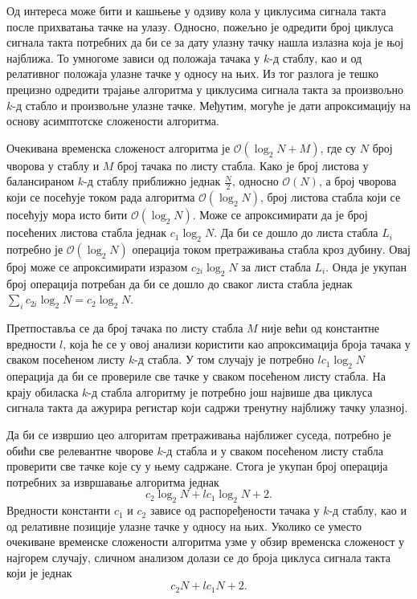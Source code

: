 \documentclass[master]{finthesis}
\newcommand*{\kd}{\texorpdfstring{$k$}{k}-д }
\begin{document}
Од интереса може бити и кашњење у одзиву кола у циклусима сигнала такта после прихватања тачке на улазу. Односно, пожељно је одредити број циклуса сигнала такта потребних да би се за дату улазну тачку нашла излазна која је њој најближа. То умногоме зависи од положаја тачака у \kd стаблу, као и од релативног положаја улазне тачке у односу на њих. Из тог разлога је тешко прецизно одредити трајање алгоритма у циклусима сигнала такта за произвољно \kd стабло и произвољне улазне тачке. Међутим, могуће је дати апроксимацију на основу асимптотске сложености алгоритма.

Очекивана временска сложеност алгоритма је $\mathcal{O}(\log_2\!N + M)$, где су $N$ број чворова у стаблу и $M$ број тачака по листу стабла. Како је број листова у балансираном \kd стаблу приближно једнак $\frac{N}{2}$, односно $\mathcal{O}(N)$, а број чворова који се посећује током рада алгоритма $\mathcal{O}(\log_2\!N)$, број листова стабла који се посећују мора исто бити $\mathcal{O}(\log_2\!N)$. Може се апроксимирати да је број посећених листова стабла једнак $c_1 \log_2\!N$. Да би се дошло до листа стабла $L_i$ потребно је $\mathcal{O}(\log_2\!N)$ операција током претраживања стабла кроз дубину. Овај број може се апроксимирати изразом $c_{2i} \log_2\!N$ за лист стабла $L_i$. Онда је укупан број операција потребан да би се дошло до сваког листа стабла једнак $\sum_i c_{2i} \log_2\!N = c_2 \log_2\!N$.

Претпоставља се да број тачака по листу стабла $M$ није већи од константне вредности $l$, која ће се у овој анализи користити као апроксимација броја тачака у сваком посећеном листу \kd стабла. У том случају је потребно $l c_1 \log_2\!N$ операција да би се провериле све тачке у сваком посећеном листу стабла. На крају обиласка \kd стабла алгоритму је потребно још највише два циклуса сигнала такта да ажурира регистар који садржи тренутну најближу тачку улазној.

Да би се извршио цео алгоритам претраживања најближег суседа, потребно је обићи све релевантне чворове \kd стабла и у сваком посећеном листу стабла проверити све тачке које су у њему садржане. Стога је укупан број операција потребних за извршавање алгоритма једнак $$c_2 \log_2\!N + l c_1 \log_2\!N + 2.$$ Вредности константи $c_1$ и $c_2$ зависе од распоређености тачака у \kd стаблу, као и од релативне позиције улазне тачке у односу на њих. Уколико се уместо очекиване временске сложености алгоритма узме у обзир временска сложеност у најгорем случају, сличном анализом долази се до броја циклуса сигнала такта који је једнак $$c_2 N + l c_1 N + 2.$$
\end{document}
